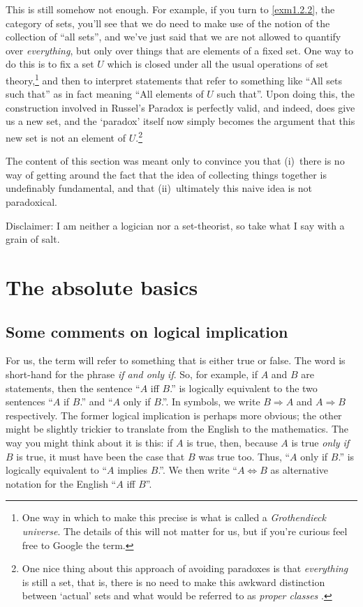 This is still somehow not enough.  For example, if you turn to \cref{exm1.2.2}, the category of sets, you'll see that we do need to make use of the notion of the collection of ``all sets'', and we've just said that we are not allowed to quantify over \emph{everything}, but only over things that are elements of a fixed set.  One way to do this is to fix a set $U$ which is closed under all the usual operations of set theory,\footnote{One way in which to make this precise is what is called a \emph{Grothendieck universe}.  The details of this will not matter for us, but if you're curious feel free to Google the term.} and then to interpret statements that refer to something like ``All sets such that\textellipsis '' as in fact meaning ``All elements of $U$ such that\textellipsis ''.  Upon doing this, the construction involved in Russel's Paradox is perfectly valid, and indeed, does give us a new set, and the `paradox' itself now simply becomes the argument that this new set is not an element of $U$.\footnote{One nice thing about this approach of avoiding paradoxes is that \emph{everything} is still a set, that is, there is no need to make this awkward distinction between `actual' sets and what would be referred to as \emph{proper classes}
.}

The content of this section was meant only to convince you that (i)~there is no way of getting around the fact that the idea of collecting things together is undefinably fundamental, and that (ii)~ultimately this naive idea is not paradoxical.

Disclaimer:  I am neither a logician nor a set-theorist, so take what I say with a grain of salt.

\section{The absolute basics}\label{sbsA.1.2}

\subsection{Some comments on logical implication}

For us, the term  will refer to something that is either true or false.  The word  is short-hand for the phrase \emph{if and only if}.  So, for example, if $A$ and $B$ are statements, then the sentence ``$A$ iff $B$.'' is logically equivalent to the two sentences ``$A$ if $B$.'' and ``$A$ only if $B$.''.  In symbols, we write $B\Rightarrow A$ and $A\Rightarrow B$ respectively.  The former logical implication is perhaps more obvious; the other might be slightly trickier to translate from the English to the mathematics.  The way you might think about it is this:  if $A$ is true, then, because $A$ is true \emph{only if} $B$ is true, it must have been the case that $B$ was true too.  Thus, ``$A$ only if $B$.'' is logically equivalent to ``$A$ implies $B$.''.  We then write ``$A\Leftrightarrow B$ as alternative notation for the English ``$A$ iff $B$''.

